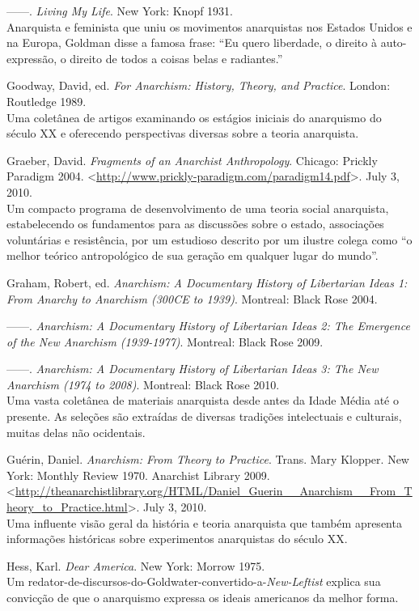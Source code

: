 \begin{hangparas}{0.25in}{1}
------. \emph{Living My Life}. New York: Knopf 1931.\smallskip\\
Anarquista e feminista que uniu os movimentos anarquistas nos Estados Unidos e na Europa, Goldman disse a famosa frase: ``Eu quero liberdade, o direito à auto-expressão, o direito de todos a coisas belas e radiantes.''

Goodway, David, ed. \emph{For Anarchism: History, Theory, and Practice}. London: Routledge 1989.\smallskip\\
Uma coletânea de artigos examinando os estágios iniciais do anarquismo do século XX e oferecendo perspectivas diversas sobre a teoria anarquista.

Graeber, David. \emph{Fragments of an Anarchist Anthropology}. Chicago: Prickly Paradigm 2004. <\url{http://www.prickly-paradigm.com/paradigm14.pdf}>. July 3, 2010.\smallskip\\
Um compacto programa de desenvolvimento de uma teoria social anarquista, estabelecendo os fundamentos para as discussões sobre o estado, associações voluntárias e resistência, por um estudioso descrito por um ilustre colega como ``o melhor teórico antropológico de sua geração em qualquer lugar do mundo''.

Graham, Robert, ed. \emph{Anarchism: A Documentary History of Libertarian Ideas 1: From Anarchy to Anarchism (300CE to 1939)}. Montreal: Black Rose 2004.

------. \emph{Anarchism: A Documentary History of Libertarian Ideas 2: The Emergence of the New Anarchism (1939-1977)}. Montreal: Black Rose 2009.

------. \emph{Anarchism: A Documentary History of Libertarian Ideas 3: The New Anarchism (1974 to 2008)}. Montreal: Black Rose 2010.\smallskip\\
Uma vasta coletânea de materiais anarquista desde antes da Idade Média até o presente. As seleções são extraídas de diversas tradições intelectuais e culturais, muitas delas não ocidentais.

Guérin, Daniel. \emph{Anarchism: From Theory to Practice}. Trans. Mary Klopper. New York: Monthly Review 1970. Anarchist Library 2009. <\url{http://theanarchistlibrary.org/HTML/Daniel_Guerin__Anarchism__From_Theory_to_Practice.html}>. July 3, 2010.\smallskip\\
Uma influente visão geral da história e teoria anarquista que também apresenta informações históricas sobre experimentos anarquistas do século XX.

Hess, Karl. \emph{Dear America}. New York: Morrow 1975.\smallskip\\
Um redator-de-discursos-do-Goldwater-convertido-a-\emph{New-Leftist} explica sua convicção de que o anarquismo expressa os ideais americanos da melhor forma.


\end{hangparas}
